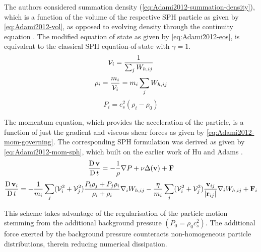 The authors considered summation density (\ref{eq:Adami2012-summation-density}), which is a function of the volume of the respective SPH particle as given by \ref{eq:Adami2012-vol}, as opposed to evolving density through the continuity equation \parencite{hu2006multi}. The modified equation of state as given by \ref{eq:Adami2012-eos}, is equivalent to the classical SPH equation-of-state with $\gamma=1$.
\begin{equation}
	\Vol_i = \frac{1}{\sum_j \WIJ}
	\label{eq:Adami2012-vol}
\end{equation}
\begin{equation}
	\rho_i = \frac{m_i}{\Vol_i} = m_i\sum_j \WIJ
	\label{eq:Adami2012-summation-density}
\end{equation}
\begin{equation}
	P_i = c_s^2 (\rho_i - \rho_0)
	\label{eq:Adami2012-eos}
\end{equation}

The momentum equation, which provides the acceleration of the particle, is a function of just the gradient and viscous shear forces as given by \ref{eq:Adami2012-mom-governing}. The corresponding SPH formulation was derived as given by \ref{eq:Adami2012-mom-sph}, which built on the earlier work of Hu and Adams \parencite{hu2007incompressible}.
\begin{equation}
	\LagDerivative{\vect{v}} = -\frac{1}{\rho}\nabla P + \nu \Delta( \vect{v} ) + \vect{F}
	\label{eq:Adami2012-mom-governing}
\end{equation}
\begin{equation}
	\LagDerivative{\vect{v}_i} = -\frac{1}{m_i} \sum_j (\Vol^2_i + \Vol^2_j) \frac{P_i \rho_j + P_j \rho_i}{\rho_i + \rho_i} \DWIJ - \frac{\eta}{m_i} \sum_j (\Vol^2_i + \Vol^2_j) \frac{\VIJ}{\RtwoIJ[]}\DWIJ + \vect{F}_i
	\label{eq:Adami2012-mom-sph}
\end{equation}

This scheme takes advantage of the regularisation of the
particle motion stemming from the additional background pressure $(P_0 = \rho_0 c_s^2)$. The additional force exerted by the background pressure counteracts non-homogeneous particle distributions, therein reducing numerical dissipation.

